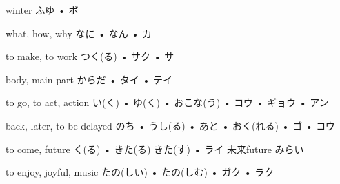 



\setcounter{cardnum}{17}

		{winter}
		{ふゆ • ボ}
		{}{}
		{}{}
		{}{}
		{}{}
		{}{}

		{what, how, why}
		{なに • なん • カ}
		{}{}
		{}{}
		{}{}
		{}{}
		{}{}

		{to make, to work}
		{つく(る) • サク • サ}
		{}{}
		{}{}
		{}{}
		{}{}
		{}{}

		{body, main part}
		{からだ • タイ • テイ}
		{}{}
		{}{}
		{}{}
		{}{}
		{}{}

		{to go, to act, action}
		{い(く) • ゆ(く) • おこな(う) • コウ • ギョウ • アン}
		{}{}
		{}{}
		{}{}
		{}{}
		{}{}

		{back, later, to be delayed}
		{のち • うし(る) • あと • おく(れる) • ゴ • コウ}
		{}{}
		{}{}
		{}{}
		{}{}
		{}{}

		{to come, future}
		{く(る) • きた(る) きた(す) • ライ}
		{未来}{future みらい}
		{}{}
		{}{}
		{}{}
		{}{}

		{to enjoy, joyful, music}
		{たの(しい) • たの(しむ) • ガク • ラク}
		{}{}
		{}{}
		{}{}
		{}{}
		{}{}

